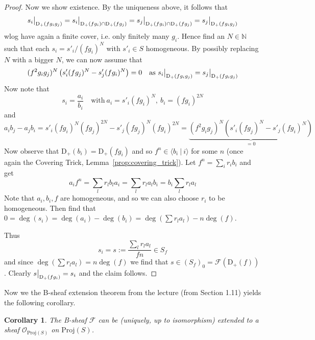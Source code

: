 \documentclass{scrartcl}
\newcommand{\N}{\mathbb{N}}
\newcommand{\D}[1]{\mathrm{D}_+(#1)}
\newcommand{\Proj}{\mathrm{Proj}}
\renewcommand{\O}{\mathcal{O}}
\newcommand\restr[2]{{
    \left.\kern-\nulldelimiterspace
    #1
    \vphantom{\big|}
    \right|_{#2}
}}
\newtheorem{corollary}[subsection]{Corollary}
\theoremstyle{definition}
\begin{document}
\begin{proof}
    Now we show existence.
    By the uniqueness above, it follows that
    \begin{equation*}
        \restr{s_i}{\D{fg_ig_j}} = \restr{s_i}{\D{fg_i} \cap \D{fg_j}} = \restr{s_j}{\D{fg_i} \cap \D{fg_j}} = \restr{s_j}{\D{fg_ig_j}}
    \end{equation*}
    wlog have again a finite cover, i.e. only finitely many $g_i$.
    Hence find an $N \in \N$ such that each $s_i = s'_i / (fg_i)^N$ with $s'_i \in S$ homogeneous.
    By possibly replacing $N$ with a bigger $N$, we can now assume that
    \begin{equation*}
        (f^2g_ig_j)^N \left( s'_i (fg_j)^N - s'_j (fg_i)^N \right) = 0 \quad \text{as $\restr{s_i}{\D{fg_ig_j}} = \restr{s_j}{\D{fg_ig_j}}$}
    \end{equation*}
    Now note that
    \begin{equation*}
        s_i = \frac {a_i} {b_i} \quad \text{with}\ a_i = s'_i(fg_i)^N, \ b_i = (fg_i)^{2N}
    \end{equation*}
    and
    \begin{equation*}
        a_i b_j - a_j b_i = s'_i (fg_i)^N (fg_j)^{2N} - s'_j (fg_j)^N (fg_i)^{2N} = \underbrace{(f^2g_ig_j)^N \left(s'_i (fg_j)^N - s'_j (fg_i)^N \right)}_{= 0}
    \end{equation*}
    Now observe that $\D{b_i} = \D{fg_i}$ and so $f^n \in \langle b_i \ | \ i \rangle$ for some $n$ (once again the Covering Trick, Lemma~\ref{prop:covering_trick}).
    Let $f^n = \sum_i r_i b_i$ and get
    \begin{equation*}
        a_i f^n = \sum_l r_l b_l a_i = \sum_l r_l a_l b_i = b_i \sum_l r_l a_l
    \end{equation*}
    Note that $a_i, b_i, f$ are homogeneous, and so we can also choose $r_i$ to be homogeneous.
    Then find that $0 = \deg(s_i) = \deg(a_i) - \deg(b_i) = \deg(\sum r_l a_l) - n\deg(f)$.

    Thus
    \begin{equation*}
        s_i = s := \frac {\sum_l r_l a_l} {fn} \in S_f
    \end{equation*}
    and since $\deg(\sum r_l a_l) = n\deg(f)$ we find that $s \in (S_f)_0 = \mathcal{F}(\D{f})$.
    Clearly $\restr{s}{\D{fg_i}} = s_i$ and the claim follows.
\end{proof}
Now we the B-sheaf extension theorem from the lecture (from Section 1.11) yields the following corollary.
\begin{corollary}
    The B-sheaf $\mathcal{F}$ can be (uniquely, up to isomorphism) extended to a sheaf $\O_{\Proj(S)}$ on $\Proj(S)$.
\end{corollary}
\end{document}
